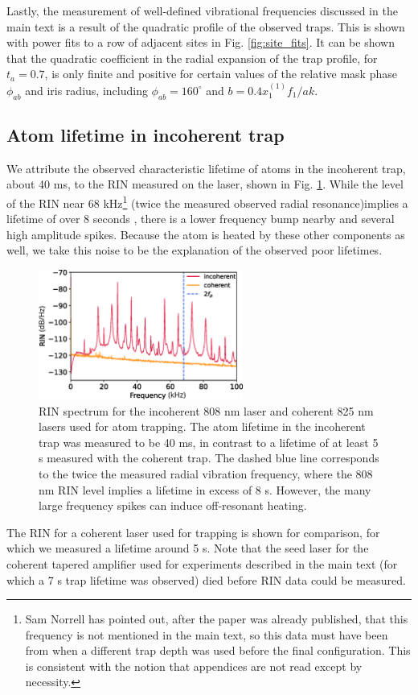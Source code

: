 Lastly, the measurement of well-defined vibrational frequencies discussed in the main text is a result of the quadratic profile of the observed traps. This is shown with power fits to a row of adjacent sites in Fig. \ref{fig:site_fits}. It can be shown that the quadratic coefficient in the radial expansion of the trap profile, for $t_a=0.7$, is only finite and positive for certain values of the relative mask phase $\phi_{ab}$ and iris radius, including $\phi_{ab}=160^{\circ}$ and $b=0.4x^{(1)}_1 f_1/a k$.

\subsection{Atom lifetime in incoherent trap}\label{sub:lifetime}
We attribute the observed characteristic lifetime of atoms in the incoherent trap, about 40 ms, to the RIN measured on the laser, shown in Fig. \ref{fig:rin}. While the level of the RIN near 68 kHz\footnote{Sam Norrell has pointed out, after the paper was already published, that this frequency is not mentioned in the main text, so this data must have been from when a different trap depth was used before the final configuration. This is consistent with the notion that appendices are not read except by necessity.} (twice the measured observed radial resonance)implies a lifetime of over 8 seconds \cite{Gehm1998}, there is a lower frequency bump nearby and several high amplitude spikes. Because the atom is heated by these other components as well, we take this noise to be the explanation of the observed poor lifetimes. 
\begin{figure}[t!]
    \centering
    \includegraphics[width=0.6\textwidth]{Images/figure9.eps}
    \caption{RIN spectrum for the incoherent 808 nm laser and coherent 825 nm lasers used for atom trapping. The  atom lifetime in the incoherent trap was measured to be 40 ms, in contrast to a lifetime of at least 5 s measured with the coherent trap. The dashed blue line corresponds to the twice the measured radial vibration frequency, where the 808 nm RIN level implies a lifetime in excess of 8 s. However, the many large frequency spikes can induce off-resonant heating.}
    \label{fig:rin}
\end{figure}
The RIN for a coherent laser used for trapping is shown for comparison, for which we measured a lifetime around 5 s. Note that the seed laser for the coherent tapered amplifier used for experiments described in the main text (for which a 7 s trap lifetime was observed) died before RIN data could be measured. 

